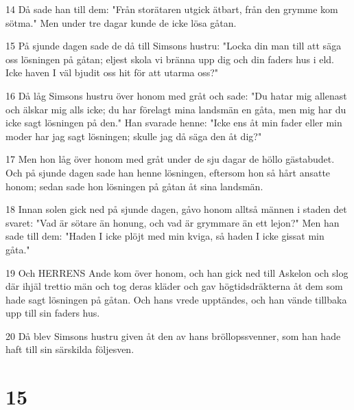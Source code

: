 \par 14 Då sade han till dem: "Från storätaren utgick ätbart, från den grymme kom sötma." Men under tre dagar kunde de icke lösa gåtan.
\par 15 På sjunde dagen sade de då till Simsons hustru: "Locka din man till att säga oss lösningen på gåtan; eljest skola vi bränna upp dig och din faders hus i eld. Icke haven I väl bjudit oss hit för att utarma oss?"
\par 16 Då låg Simsons hustru över honom med gråt och sade: "Du hatar mig allenast och älskar mig alls icke; du har förelagt mina landsmän en gåta, men mig har du icke sagt lösningen på den." Han svarade henne: "Icke ens åt min fader eller min moder har jag sagt lösningen; skulle jag då säga den åt dig?"
\par 17 Men hon låg över honom med gråt under de sju dagar de höllo gästabudet. Och på sjunde dagen sade han henne lösningen, eftersom hon så hårt ansatte honom; sedan sade hon lösningen på gåtan åt sina landsmän.
\par 18 Innan solen gick ned på sjunde dagen, gåvo honom alltså männen i staden det svaret: "Vad är sötare än honung, och vad är grymmare än ett lejon?" Men han sade till dem: "Haden I icke plöjt med min kviga, så haden I icke gissat min gåta."
\par 19 Och HERRENS Ande kom över honom, och han gick ned till Askelon och slog där ihjäl trettio män och tog deras kläder och gav högtidsdräkterna åt dem som hade sagt lösningen på gåtan. Och hans vrede upptändes, och han vände tillbaka upp till sin faders hus.
\par 20 Då blev Simsons hustru given åt den av hans bröllopssvenner, som han hade haft till sin särskilda följesven.

\chapter{15}

